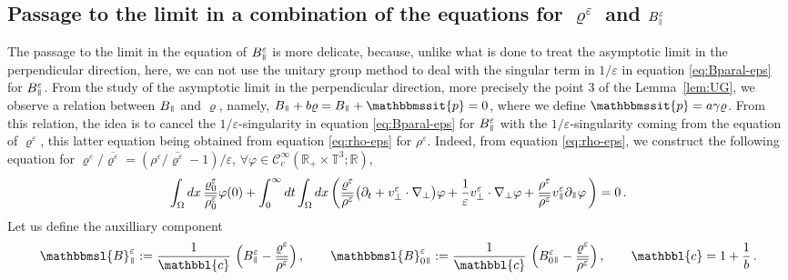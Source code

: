 \documentclass[11pt,reqno]{amsart}
\def \R{{\mathbb{R}}}
\def \T{{\mathbb{T}}}
\newcommand{\myparallel}{{\mkern3mu\vphantom{\perp}\vrule depth 0pt\mkern2mu\vrule depth 0pt\mkern3mu}}
\begin{document}
\subsection{Passage to the limit in a combination of the equations for $ \varrho^\varepsilon $ and  $B_{\raisebox{0.5pt}{$\scriptscriptstyle\parallel$}}^\varepsilon $}
\label{ss:cv-Bpara-P}
The passage to the limit in the equation of $B_\myparallel^\varepsilon$ is more delicate, because, unlike what is done to treat the asymptotic limit in the perpendicular direction, here, we can not use the unitary group method to deal with the singular term in $1/\varepsilon$ in equation \eqref{eq:Bparal-eps} for $B_\myparallel^\varepsilon$. From the study of the asymptotic limit in the perpendicular direction, more precisely the point 3 of the Lemma~\ref{lem:UG}, we observe a relation between $B_\myparallel$ and $\varrho$, namely, $B_\myparallel + b \varrho = B_\myparallel + \mathbbmssit{p} =0$, where we define $ \mathbbmssit{p} =a \gamma \varrho$. From this relation, the idea is to cancel the   $1/\varepsilon$-singularity in equation \eqref{eq:Bparal-eps} for $B_\myparallel^\varepsilon$ with the  $1/\varepsilon$-singularity coming from the equation of $\varrho^\varepsilon$, this latter equation being obtained from equation \eqref{eq:rho-eps} for $\rho^\varepsilon$. Indeed, from equation \eqref{eq:rho-eps}, we construct the following equation for $\varrho^\varepsilon/\overline{\varrho^\varepsilon} = (\rho^\varepsilon/\overline{\varrho^\varepsilon}-1)/\varepsilon$, $\forall \varphi \in \mathscr{C}_c^\infty(\R_+\times \T^3; \R)$,
\begin{equation}
  \label{eq:varrho-eps}
  \int_\Omega dx \,\frac{\varrho_0^\varepsilon} {\overline{\rho_0^\varepsilon}}\varphi(0) +
  \int_0^\infty dt \int_\Omega dx \, \bigg (\frac{\varrho^\varepsilon}{\overline{\rho^\varepsilon}} \big(
  \partial_t  + v_\perp^\varepsilon \cdot \nabla_\perp \big) \varphi + \frac{1}{\varepsilon}v_\perp^\varepsilon \cdot \nabla_\perp \varphi
  + \frac{\rho^\varepsilon}{\overline{\rho^\varepsilon}}v_\myparallel^\varepsilon \partial_\myparallel \varphi \,\bigg) 
  =0\,.
\end{equation}
Let us define the auxilliary component
\[
\mathbbmsl{B}_\myparallel^\varepsilon := \frac{1}{\mathbbl{c}} \ \Bigl(B_\myparallel^\varepsilon -\frac{\varrho^\varepsilon}{\overline{\rho^\varepsilon}}\Bigr) \, , \qquad \mathbbmsl{ B}_{0\myparallel}^\varepsilon := \frac{1}{\mathbbl{c}} \ \Bigl(B_{0\myparallel}^\varepsilon -\frac{\varrho^\varepsilon}{\overline{\rho^\varepsilon}}\Bigr) \, , \qquad \mathbbl{c} = 1 + \frac{1}{b} \, .
\]
\end{document}
